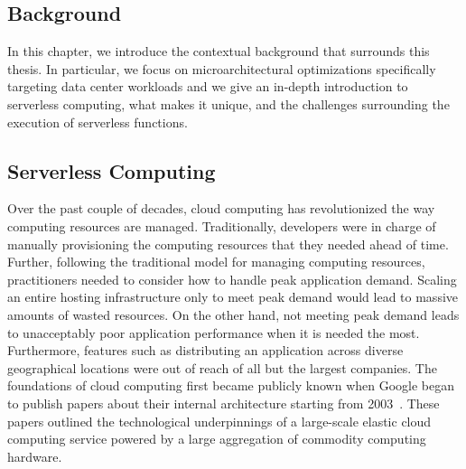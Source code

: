 \documentclass[../main.tex]{subfiles}
\begin{document}
\ifx\chapincluded\undefined
  \begin{refsection}
 \fi

\chapter{Background}
\label{chap:background}
In this chapter, we introduce the contextual background that surrounds
this thesis. In particular, we focus on microarchitectural
optimizations specifically targeting data center workloads and we give
an in-depth introduction to serverless computing, what makes it unique,
and the challenges surrounding the execution of serverless functions.



\section{Serverless Computing}
\label{sec:serverless}


Over the past couple of decades, cloud computing has revolutionized
the way computing resources are managed. Traditionally, developers
were in charge of manually provisioning the computing resources that
they needed ahead of time. Further, following the traditional model
for managing computing resources, practitioners needed to
consider how to handle peak application demand. Scaling an entire
hosting infrastructure only to meet peak demand would lead to massive
amounts of wasted resources. On the other hand, not meeting peak
demand leads to unacceptably poor application performance when it is
needed the most. Furthermore, features such as distributing an
application across diverse geographical locations were out of reach of
all but the largest companies. The foundations of cloud computing
first became publicly known when Google began to publish papers about
their internal architecture starting from
2003~\cite{qian2009cloud,gfs,dean2008mapreduce,barroso03_web_searc_planet}. These
papers outlined the technological underpinnings of a large-scale
elastic cloud computing service powered by a large aggregation of
commodity computing hardware.


\end{refsection}
\end{document}
